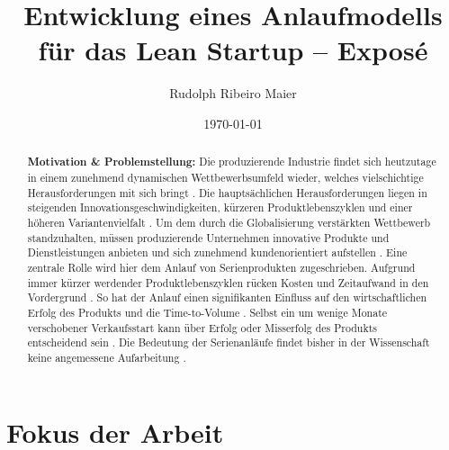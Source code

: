 \documentclass[%
a4paper,
aps,
pra,
 longbibliography,
 lengthcheck,%
]{revtex4-1}
\begin{document}

\title{Entwicklung eines Anlaufmodells für das Lean Startup -- Exposé}

\author{Rudolph Ribeiro Maier}


\date{\today}%

\begin{abstract}
\textbf{Motivation \& Problemstellung:}
Die produzierende Industrie findet sich heutzutage in einem zunehmend dynamischen Wettbewerbsumfeld wieder, welches vielschichtige Herausforderungen mit sich bringt \cite{Renner2012}. Die hauptsächlichen Herausforderungen liegen in steigenden Innovationsgeschwindigkeiten, kürzeren Produktlebenszyklen und einer höheren Variantenvielfalt \cite{Kuhn2002,Stauder2016}. Um dem durch die Globalisierung verstärkten Wettbewerb standzuhalten, müssen produzierende Unternehmen innovative Produkte und Dienstleistungen anbieten und sich zunehmend kundenorientiert aufstellen \cite{Surbier2014}. 
Eine zentrale Rolle wird hier dem Anlauf von Serienprodukten zugeschrieben. Aufgrund immer kürzer werdender Produktlebenszyklen rücken Kosten und Zeitaufwand in den Vordergrund \cite{Winkler2007}. So hat der Anlauf einen signifikanten Einfluss auf den wirtschaftlichen Erfolg des Produkts und die Time-to-Volume \cite{Klocke16}. Selbst ein um wenige Monate verschobener Verkaufsstart kann über Erfolg oder Misserfolg des Produkts entscheidend sein \cite{Schuh2008a}. Die Bedeutung der Serienanläufe findet bisher in der Wissenschaft keine angemessene Aufarbeitung \cite{Dyckhoff2012}. 
\end{abstract}

\maketitle


\section{Fokus der Arbeit}
\end{document}
